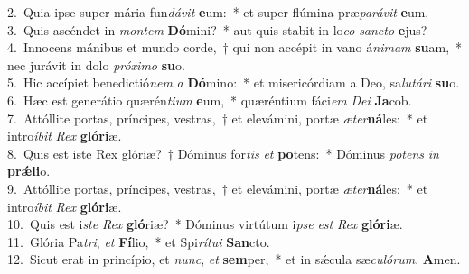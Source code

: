 {2.~}Quia ipse super mária fun\textit{dá}\textit{vit} \textbf{e}um:~* et super flúmina præ\textit{pa}\textit{rá}\textit{vit} \textbf{e}um.\\
{3.~}Quis ascéndet in \textit{mon}\textit{tem} \textbf{Dó}mini?~* aut quis stabit in lo\textit{co} \textit{san}\textit{cto} \textbf{e}jus?\\
{4.~}Innocens mánibus et mundo corde,~† qui non accépit in vano á\textit{ni}\textit{mam} \textbf{su}am,~* nec jurávit in dolo \textit{pró}\textit{xi}\textit{mo} \textbf{su}o.\\
{5.~}Hic accípiet benedictió\textit{nem} \textit{a} \textbf{Dó}mino:~* et misericórdiam a Deo, sa\textit{lu}\textit{tá}\textit{ri} \textbf{su}o.\\
{6.~}Hæc est generátio quærén\textit{ti}\textit{um} \textbf{e}um,~* quæréntium fáci\textit{em} \textit{De}\textit{i} \textbf{Ja}cob.\\
{7.~}Attóllite portas, príncipes, vestras,~† et elevámini, portæ \textit{æ}\textit{ter}\textbf{ná}les:~* et intro\textit{í}\textit{bit} \textit{Rex} \textbf{gló}\textbf{ri}æ.\\
{8.~}Quis est iste Rex glóriæ?~† Dóminus for\textit{tis} \textit{et} \textbf{po}tens:~* Dóminus \textit{po}\textit{tens} \textit{in} \textbf{prǽ}\textbf{li}o.\\
{9.~}Attóllite portas, príncipes, vestras,~† et elevámini, portæ \textit{æ}\textit{ter}\textbf{ná}les:~* et intro\textit{í}\textit{bit} \textit{Rex} \textbf{gló}\textbf{ri}æ.\\
{10.~}Quis est i\textit{ste} \textit{Rex} \textbf{gló}riæ?~* Dóminus virtútum i\textit{pse} \textit{est} \textit{Rex} \textbf{gló}\textbf{ri}æ.\\
{11.~}Glória Pa\textit{tri}, \textit{et} \textbf{Fí}lio,~* et Spi\textit{rí}\textit{tu}\textit{i} \textbf{San}cto.\\
{12.~}Sicut erat in princípio, et \textit{nunc}, \textit{et} \textbf{sem}per,~* et in sǽcula sæ\textit{cu}\textit{ló}\textit{rum}. \textbf{A}men.\\
